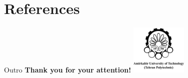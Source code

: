 \documentclass{beamer}
\begin{document}
\section{References}

\begin{frame}
    \printbibliography
\end{frame}


\begin{frame}{Outro}
    \centering
    {\Large \textbf{Thank you for your attention!}} \vspace{1cm} %
    \vfill %
    \includegraphics[width=0.2\textwidth]{amirkabir.png} %
\end{frame}
\end{document}
